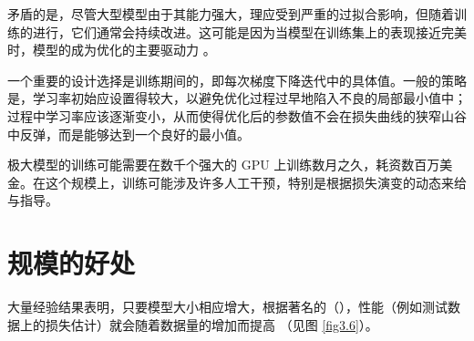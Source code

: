 矛盾的是，尽管大型模型由于其能力强大，理应受到严重的过拟合影响，但随着训练的进行，它们通常会持续改进。这可能是因为当模型在训练集上的表现接近完美时，模型的成为优化的主要驱动力 \citep{arxiv-1812.11118}。

一个重要的设计选择是训练期间的，即每次梯度下降迭代中的具体值。一般的策略是，学习率初始应设置得较大，以避免优化过程过早地陷入不良的局部最小值中；过程中学习率应该逐渐变小，从而使得优化后的参数值不会在损失曲线的狭窄山谷中反弹，而是能够达到一个良好的最小值。

极大模型的训练可能需要在数千个强大的 GPU 上训练数月之久，耗资数百万美金。在这个规模上，训练可能涉及许多人工干预，特别是根据损失演变的动态来给与指导。

\section{规模的好处}\label{sec3.7}

大量经验结果表明，只要模型大小相应增大，根据著名的（），性能（例如测试数据上的损失估计）就会随着数据量的增加而提高 \citep{arxiv-2001.08361}（见图 \ref{fig3.6}）。

